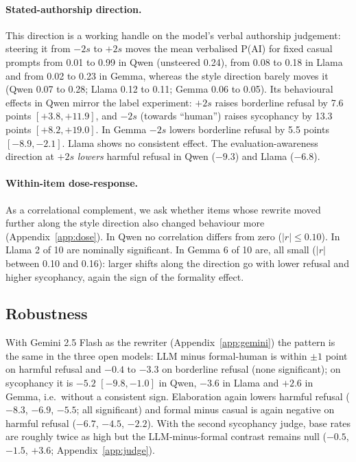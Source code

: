 \paragraph{Stated-authorship direction.} This direction is a working handle on the model's verbal authorship judgement: steering it from $-2s$ to $+2s$ moves the mean verbalised P(AI) for fixed casual prompts from 0.01 to 0.99 in Qwen (unsteered 0.24), from 0.08 to 0.18 in Llama and from 0.02 to 0.23 in Gemma, whereas the style direction barely moves it (Qwen 0.07 to 0.28; Llama 0.12 to 0.11; Gemma 0.06 to 0.05). Its behavioural effects in Qwen mirror the label experiment: $+2s$ raises borderline refusal by 7.6 points $[+3.8,+11.9]$, and $-2s$ (towards ``human'') raises sycophancy by 13.3 points $[+8.2,+19.0]$. In Gemma $-2s$ lowers borderline refusal by 5.5 points $[-8.9,-2.1]$. Llama shows no consistent effect. The evaluation-awareness direction at $+2s$ \emph{lowers} harmful refusal in Qwen ($-9.3$) and Llama ($-6.8$).

\paragraph{Within-item dose-response.} As a correlational complement, we ask whether items whose rewrite moved further along the style direction also changed behaviour more (Appendix~\ref{app:dose}). In Qwen no correlation differs from zero ($|r|\le0.10$). In Llama 2 of 10 are nominally significant. In Gemma 6 of 10 are, all small ($|r|$ between 0.10 and 0.16): larger shifts along the direction go with lower refusal and higher sycophancy, again the sign of the formality effect.

\subsection{Robustness}
With Gemini 2.5 Flash as the rewriter (Appendix~\ref{app:gemini}) the pattern is the same in the three open models: LLM minus formal-human is within $\pm1$ point on harmful refusal and $-0.4$ to $-3.3$ on borderline refusal (none significant); on sycophancy it is $-5.2$ $[-9.8,-1.0]$ in Qwen, $-3.6$ in Llama and $+2.6$ in Gemma, i.e.\ without a consistent sign. Elaboration again lowers harmful refusal ($-8.3$, $-6.9$, $-5.5$; all significant) and formal minus casual is again negative on harmful refusal ($-6.7$, $-4.5$, $-2.2$). With the second sycophancy judge, base rates are roughly twice as high but the LLM-minus-formal contrast remains null ($-0.5$, $-1.5$, $+3.6$; Appendix~\ref{app:judge}).
